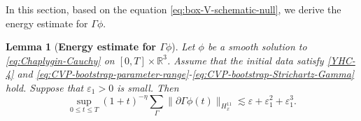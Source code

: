 \documentclass[11pt,twoside]{article}
\def\p{\partial}
\def\ve{\varepsilon}
\def\ls{\lesssim}
\theoremstyle{plain}
\newtheorem{lemma}[theorem]{Lemma}
\theoremstyle{definition}
\theoremstyle{assumption}
\numberwithin{equation}{section}
\begin{document}
	In this section, based on the equation \eqref{eq:box-V-schematic-null}, we derive the energy estimate for $\Gamma\phi$.

	
	\begin{lemma}[{\bf Energy estimate for $\Gamma\phi$}]
		\label{lem:CVP-one-Gamma-energy-closure}
	Let \(\phi\) be a smooth solution to
	\eqref{eq:Chaplygin-Cauchy} on \([0,T]\times\mathbb R^3\).
	Assume that the initial data satisfy \eqref{YHC-4} and
	\eqref{eq:CVP-bootstrap-parameter-range}-\eqref{eq:CVP-bootstrap-Strichartz-Gamma}
		hold. Suppose that \(\ve_1>0\) is small. Then
		\begin{equation}
			\label{eq:CVP-one-Gamma-energy-conclusion}
			\sup_{0\le t\le T}
			(1+t)^{-\eta}
			\sum_{\Gamma}
			\|\p\Gamma\phi(t)\|_{H^{11}_x}
			\ls
			\ve+\ve_1^2+\ve_1^3.
		\end{equation}
		\end{lemma}
		
\end{document}
